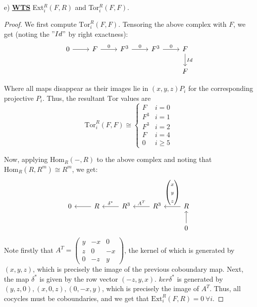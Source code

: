 \documentclass{article}
\newcommand{\Hom}{\text{Hom}}
\newcommand{\Tor}{\text{Tor}}
\newcommand{\Ext}{\text{Ext}}
\begin{document}
\newpage 

e) \textbf{\underline{WTS}} Ext$^{R}_{i}(F,R)$ and Tor$^{R}_{i}(F,F)$.
\begin{proof}
  
We first compute $\Tor_{i}^{R}(F,F)$. Tensoring the above complex with $F$, we get (noting the $"Id"$ by right exactness):
\[
  \begin{tikzcd}
0 \arrow[r] & F \arrow[r, "0"] & F^3 \arrow[r, "0"] & F^3 \arrow[r, "0"] & F \arrow[d, "Id"] \\
  &          &                    &                    & F                
\end{tikzcd}
\]

Where all maps disappear as their images lie in $(x,y,z)P_{i}$ for the corresponding projective $P_{i}$. Thus, the resultant $\Tor$ values are
\[
  \Tor_{i}^{R}(F,F) \cong
  \begin{cases}
    F & i = 0\\
    F^{3} & i = 1 \\
    F^{3} & i = 2 \\
    F & i = 4 \\
    0 & i \geq 5
  \end{cases}
\]

Now, applying $\Hom_{R}(-, R)$ to the above complex and noting that $\Hom_{R}(R,R^{m}) \cong R^{m}$, we get:
\[
\begin{tikzcd}
0 & R \arrow[l] & {R^3} \arrow[l, "\delta^{*}"'] & {R^3} \arrow[l, "A^T"'] & {R} \arrow[l, "\begin{pmatrix} x \\ y \\ z \end{pmatrix}"'] \\
 &  &                           &                                    & 0 \arrow[u]                                                
\end{tikzcd}
\]
Note firstly that $A^{T} = \begin{pmatrix} y & -x & 0 \\ z & 0 & -x \\ 0 & -z & y \end{pmatrix}$, the kernel of which is generated by $(x,y,z)$, which is precisely the image of the previous coboundary map. Next, the map $\delta^{*}$ is given by the row vector $(-z,y,x)$. $ker\delta^{*}$ is generated by $(y,z,0), (x,0,z), (0,-x,y)$, which is precisely the image of $A^{T}$. Thus, all cocycles must be coboundaries, and we get that $\Ext_{i}^{R}(F,R) = 0 \ \forall i$.
\end{proof}
\end{document}

